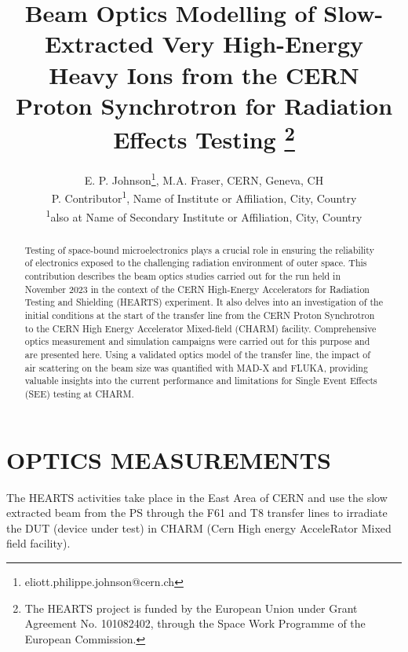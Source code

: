 \documentclass[a4paper,
               biblatex,     %
               ]{jacow}
\begin{document}
\title{Beam Optics Modelling of Slow-Extracted Very High-Energy Heavy Ions from the CERN Proton Synchrotron for Radiation Effects Testing \thanks{The HEARTS project is funded by the European Union under Grant Agreement No. 101082402, through the Space Work Programme of the European Commission.}}

\author{E. P. Johnson\thanks{eliott.philippe.johnson@cern.ch}, M.A. Fraser, CERN, Geneva, CH \\
		P. Contributor\textsuperscript{1}, Name of Institute or Affiliation, City, Country \\
		\textsuperscript{1}also at Name of Secondary Institute or Affiliation, City, Country}
	
\maketitle

%
\begin{abstract}
   Testing of space-bound microelectronics plays a crucial role in ensuring the reliability of electronics exposed to the challenging radiation environment of outer space. This contribution describes the beam optics studies carried out for the run held in November 2023 in the context of the CERN High-Energy Accelerators for Radiation Testing and Shielding (HEARTS) experiment. It also delves into an investigation of the initial conditions at the start of the transfer line from the CERN Proton Synchrotron to the CERN High Energy Accelerator Mixed-field (CHARM) facility. Comprehensive optics measurement and simulation campaigns were carried out for this purpose and are presented here. Using a validated optics model of the transfer line, the impact of air scattering on the beam size was quantified with MAD-X and FLUKA, providing valuable insights into the current performance and limitations for Single Event Effects (SEE) testing at CHARM.
\end{abstract}



\section{OPTICS MEASUREMENTS}

The HEARTS activities take place in the East Area of CERN and use the slow extracted beam from the PS through the F61 and T8 transfer lines to irradiate the DUT (device under test) in CHARM (Cern High energy AcceleRator Mixed field facility).
\end{document}
